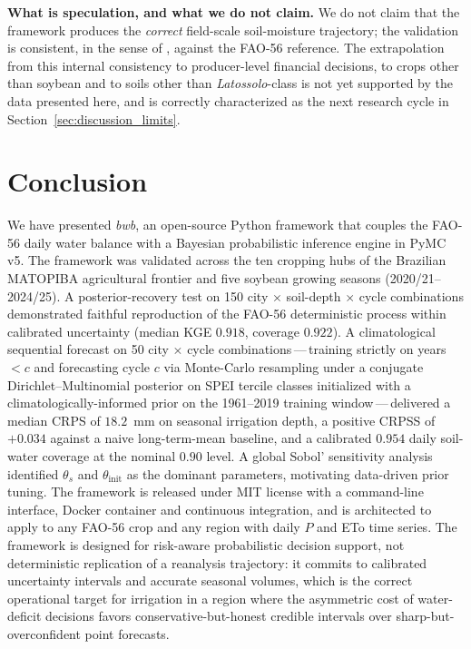 \documentclass[review,5p,times]{elsarticle}
\begin{document}
\textbf{What is speculation, and what we do not claim.} We do not
claim that the framework produces the \emph{correct} field-scale
soil-moisture trajectory; the validation is consistent, in the sense
of \citet{Cook2006,Talts2018}, against the FAO-56 reference. The
extrapolation from this internal consistency to producer-level
financial decisions, to crops other than soybean and to soils other
than \textit{Latossolo}-class is not yet supported by the data
presented here, and is correctly characterized as the next research
cycle in Section~\ref{sec:discussion_limits}.

\section{Conclusion}\label{sec:conclusion}

We have presented \emph{bwb}, an open-source Python framework that
couples the FAO-56 daily water balance with a Bayesian probabilistic
inference engine in PyMC v5. The framework was validated across the
ten cropping hubs of the Brazilian MATOPIBA agricultural frontier and
five soybean growing seasons (2020/21--2024/25). A posterior-recovery
test on 150 city $\times$ soil-depth $\times$ cycle combinations
demonstrated faithful reproduction of the FAO-56 deterministic
process within calibrated uncertainty (median KGE $0.918$, coverage
$0.922$). A climatological sequential forecast on 50 city $\times$
cycle combinations\,---\,training strictly on years $< c$ and
forecasting cycle $c$ via Monte-Carlo resampling under a conjugate
Dirichlet--Multinomial posterior on SPEI tercile classes initialized
with a climatologically-informed prior on the 1961--2019 training
window\,---\,delivered a median CRPS of $18.2$~mm on seasonal
irrigation depth, a positive CRPSS of $+0.034$ against a naive
long-term-mean baseline, and a calibrated $0.954$ daily soil-water
coverage at the nominal $0.90$ level. A global Sobol' sensitivity analysis identified $\theta_s$ and
$\theta_{\mathrm{init}}$ as the dominant parameters, motivating
data-driven prior tuning. The framework is released under MIT license
with a command-line interface, Docker container and continuous
integration, and is architected to apply to any FAO-56 crop and any
region with daily $P$ and ETo time series. The framework is
designed for risk-aware probabilistic decision support, not
deterministic replication of a reanalysis trajectory: it commits to
calibrated uncertainty intervals and accurate seasonal volumes,
which is the correct operational target for irrigation in a region
where the asymmetric cost of water-deficit decisions favors
conservative-but-honest credible intervals over sharp-but-overconfident
point forecasts.
\end{document}
